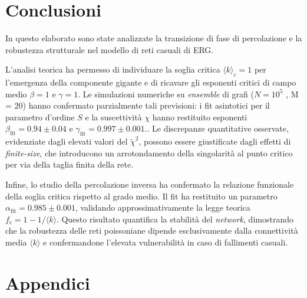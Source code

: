 \documentclass[12pt,italian]{article}
\begin{document}
\section{Conclusioni}
In questo elaborato sono state analizzate la transizione di fase di percolazione e la robustezza strutturale nel modello di reti casuali di ERG.

L'analisi teorica ha permesso di individuare la soglia critica $\langle k \rangle_c = 1$ per l'emergenza della componente gigante e di ricavare gli esponenti critici di campo medio $\beta = 1$ e $\gamma = 1$. Le simulazioni numeriche su \emph{ensemble} di grafi ($N = 10^5$ , M = 20) hanno confermato parzialmente tali previsioni: i fit asintotici per il parametro d'ordine $S$ e la suscettività $\chi$ hanno restituito esponenti $\beta_{\text{fit}} = 0.94 \pm 0.04$ e $\gamma_{\text{fit}} = 0.997 \pm 0.001$.. Le discrepanze quantitative osservate, evidenziate dagli elevati valori del $\tilde{\chi}^2$, possono essere giustificate dagli effetti di \emph{finite-size}, che introducono un arrotondamento della singolarità al punto critico per via della taglia finita della rete.

Infine, lo studio della percolazione inversa ha confermato la relazione funzionale della soglia critica rispetto al grado medio. Il fit ha restituito un parametro $\alpha_{\text{fit}} = 0.985 \pm 0.001$, validando approssimativamente la legge teorica $f_c = 1 - 1/\langle k \rangle$. Questo risultato quantifica la stabilità del \emph{network}, dimostrando che la robustezza delle reti poissoniane dipende esclusivamente dalla connettività media $\langle k \rangle$ e confermandone l'elevata vulnerabilità in caso di fallimenti casuali.

\appendix
\section{Appendici}
\end{document}
